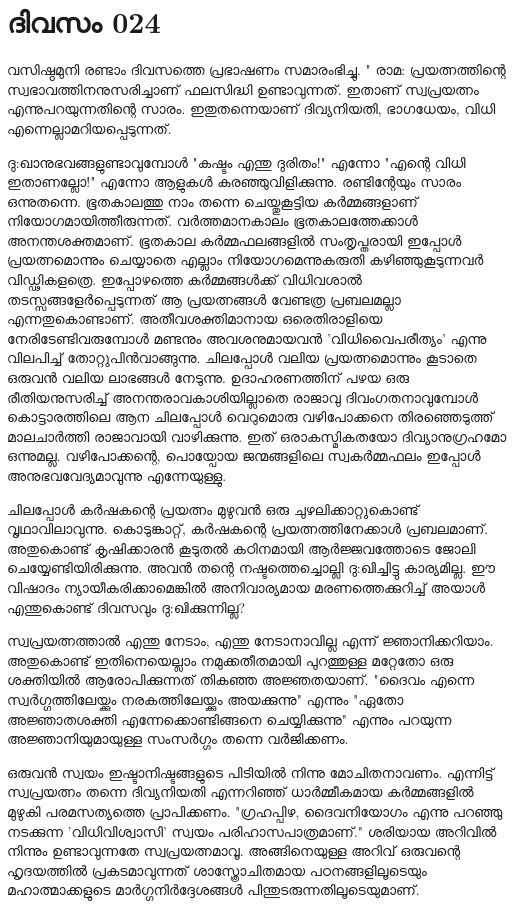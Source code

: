  
\section{ദിവസം 024}


വസിഷ്ഠമുനി രണ്ടാം ദിവസത്തെ പ്രഭാഷണം സമാരംഭിച്ചു. " രാമ: പ്രയത്നത്തിന്റെ സ്വഭാവത്തിനനുസരിച്ചാണ്‌ ഫലസിദ്ധി ഉണ്ടാവുന്നത്‌. ഇതാണ്‌ സ്വപ്രയത്നം എന്നുപറയുന്നതിന്റെ സാരം. ഇതുതന്നെയാണ്‌ ദിവ്യനിയതി, ഭാഗധേയം, വിധി എന്നെല്ലാമറിയപ്പെടുന്നത്‌.

ദു:ഖാനുഭവങ്ങളുണ്ടാവുമ്പോള്‍ "കഷ്ടം എന്തു ദുരിതം!" എന്നോ "എന്റെ വിധി ഇതാണല്ലോ!" എന്നോ ആളുകള്‍ കരഞ്ഞുവിളിക്കുന്നു. രണ്ടിന്റേയും സാരം ഒന്നുതന്നെ. ഭൂതകാലത്തു നാം തന്നെ ചെയ്തുകൂട്ടിയ കര്‍മ്മങ്ങളാണ്‌ നിയോഗമായിത്തീരുന്നത്‌. വര്‍ത്തമാനകാലം ഭൂതകാലത്തേക്കാള്‍ അനന്തശക്തമാണ്‌. ഭൂതകാല കര്‍മ്മഫലങ്ങളില്‍ സംതൃപ്തരായി ഇപ്പോള്‍ പ്രയത്നമൊന്നും ചെയ്യാതെ എല്ലാം നിയോഗമെന്നുകരുതി കഴിഞ്ഞുകൂടുന്നവര്‍ വിഡ്ഢികളത്രെ. ഇപ്പോഴത്തെ കര്‍മ്മങ്ങള്‍ക്ക്‌ വിധിവശാല്‍ തടസ്സങ്ങളേര്‍പ്പെടുന്നത്‌ ആ പ്രയത്നങ്ങള്‍ വേണ്ടത്ര പ്രബലമല്ലാ എന്നതുകൊണ്ടാണ്‌. അതീവശക്തിമാനായ ഒരെതിരാളിയെ നേരിടേണ്ടിവരുമ്പോള്‍ മണ്ടനും അവശനുമായവന്‍ 'വിധിവൈപരീത്യം' എന്നു വിലപിച്ച്‌ തോറ്റുപിന്‍വാങ്ങുന്നു. ചിലപ്പോള്‍ വലിയ പ്രയത്നമൊന്നും കൂടാതെ ഒരുവന്‍ വലിയ ലാഭങ്ങള്‍ നേടുന്നു. ഉദാഹരണത്തിന്‌ പഴയ ഒരു രീതിയനുസരിച്ച്‌ അനന്തരാവകാശിയില്ലാതെ രാജാവു ദിവംഗതനാവുമ്പോള്‍ കൊട്ടാരത്തിലെ ആന ചിലപ്പോള്‍ വെറുമൊരു വഴിപോക്കനെ തിരഞ്ഞെടുത്ത്‌ മാലചാര്‍ത്തി രാജാവായി വാഴിക്കുന്നു. ഇത്‌ ഒരാകസ്മികതയോ ദിവ്യാനുഗ്രഹമോ ഒന്നുമല്ല. വഴിപോക്കന്റെ, പൊയ്പോയ ജന്മങ്ങളിലെ സ്വകര്‍മ്മഫലം ഇപ്പോള്‍ അനുഭവവേദ്യമാവുന്നു എന്നേയുള്ളു. 

ചിലപ്പോള്‍ കര്‍ഷകന്റെ പ്രയത്നം മുഴുവന്‍ ഒരു ചുഴലിക്കാറ്റുകൊണ്ട്‌ വൃഥാവിലാവുന്നു. കൊടുങ്കാറ്റ്‌, കര്‍ഷകന്റെ പ്രയത്നത്തിനേക്കാള്‍ പ്രബലമാണ്‌. അതുകൊണ്ട്‌ കൃഷിക്കാരന്‍ കൂടുതല്‍ കഠിനമായി ആര്‍ജ്ജവത്തോടെ ജോലി ചെയ്യേണ്ടിയിരിക്കുന്നു. അവന്‍ തന്റെ നഷ്ടത്തെച്ചൊല്ലി ദു:ഖിച്ചിട്ടു കാര്യമില്ല. ഈ വിഷാദം ന്യായീകരിക്കാമെങ്കില്‍ അനിവാര്യമായ മരണത്തെക്കുറിച്ച്‌ അയാള്‍ എന്തുകൊണ്ട്‌ ദിവസവും ദു:ഖിക്കുന്നില്ല?

സ്വപ്രയത്നത്താല്‍ എന്തു നേടാം, എന്തു നേടാനാവില്ല എന്ന് ജ്ഞാനിക്കറിയാം. അതുകൊണ്ട്‌ ഇതിനെയെല്ലാം നമുക്കതീതമായി പുറത്തുള്ള മറ്റേതോ ഒരു ശക്തിയില്‍ ആരോപിക്കുന്നത്‌ തികഞ്ഞ അജ്ഞതയാണ്‌. "ദൈവം എന്നെ സ്വര്‍ഗ്ഗത്തിലേയ്ക്കും നരകത്തിലേയ്ക്കും അയക്കുന്നു" എന്നും "ഏതോ അജ്ഞാതശക്തി എന്നേക്കൊണ്ടിങ്ങനെ ചെയ്യിക്കുന്നു" എന്നും പറയുന്ന അജ്ഞാനിയുമായുള്ള സംസര്‍ഗ്ഗം തന്നെ വര്‍ജിക്കണം.

ഒരുവന്‍ സ്വയം ഇഷ്ടാനിഷ്ടങ്ങളുടെ പിടിയില്‍ നിന്നു മോചിതനാവണം. എന്നിട്ട്‌ സ്വപ്രയത്നം തന്നെ ദിവ്യനിയതി എന്നറിഞ്ഞ്‌ ധാര്‍മ്മീകമായ കര്‍മ്മങ്ങളില്‍ മുഴുകി പരമസത്യത്തെ പ്രാപിക്കണം. "ഗ്രഹപ്പിഴ, ദൈവനിയോഗം എന്നു പറഞ്ഞു നടക്കുന്ന 'വിധിവിശ്വാസി' സ്വയം പരിഹാസപാത്രമാണ്‌." ശരിയായ അറിവില്‍ നിന്നും ഉണ്ടാവുന്നതേ സ്വപ്രയത്നമാവൂ. അങ്ങിനെയുള്ള അറിവ്‌ ഒരുവന്റെ ഹൃദയത്തില്‍ പ്രകടമാവുന്നത്‌ ശാസ്ത്രോചിതമായ പഠനങ്ങളിലൂടെയും മഹാത്മാക്കളുടെ മാര്‍ഗ്ഗനിര്‍ദ്ദേശങ്ങള്‍ പിന്തുടരുന്നതിലൂടെയുമാണ്‌.
